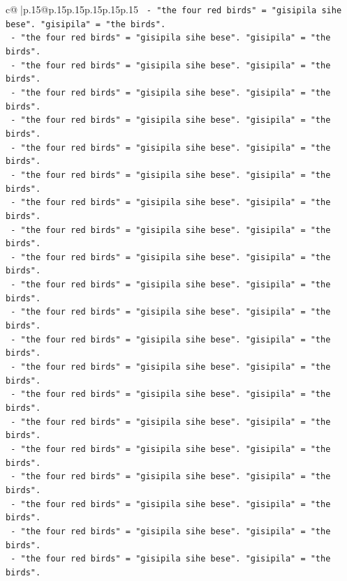 \documentclass{article}
\begin{document}
{\begin{supertabular}{c@{$\;$}|p{.15\linewidth}@{}p{.15\linewidth}p{.15\linewidth}p{.15\linewidth}p{.15\linewidth}p{.15\linewidth}}
{{{\texttt{  {-} "the four red birds" = "gisipila sihe bese". "gisipila" = "the birds".} \\
\texttt{  {-} "the four red birds" = "gisipila sihe bese". "gisipila" = "the birds".} \\
\texttt{  {-} "the four red birds" = "gisipila sihe bese". "gisipila" = "the birds".} \\
\texttt{  {-} "the four red birds" = "gisipila sihe bese". "gisipila" = "the birds".} \\
\texttt{  {-} "the four red birds" = "gisipila sihe bese". "gisipila" = "the birds".} \\
\texttt{  {-} "the four red birds" = "gisipila sihe bese". "gisipila" = "the birds".} \\
\texttt{  {-} "the four red birds" = "gisipila sihe bese". "gisipila" = "the birds".} \\
\texttt{  {-} "the four red birds" = "gisipila sihe bese". "gisipila" = "the birds".} \\
\texttt{  {-} "the four red birds" = "gisipila sihe bese". "gisipila" = "the birds".} \\
\texttt{  {-} "the four red birds" = "gisipila sihe bese". "gisipila" = "the birds".} \\
\texttt{  {-} "the four red birds" = "gisipila sihe bese". "gisipila" = "the birds".} \\
\texttt{  {-} "the four red birds" = "gisipila sihe bese". "gisipila" = "the birds".} \\
\texttt{  {-} "the four red birds" = "gisipila sihe bese". "gisipila" = "the birds".} \\
\texttt{  {-} "the four red birds" = "gisipila sihe bese". "gisipila" = "the birds".} \\
\texttt{  {-} "the four red birds" = "gisipila sihe bese". "gisipila" = "the birds".} \\
\texttt{  {-} "the four red birds" = "gisipila sihe bese". "gisipila" = "the birds".} \\
\texttt{  {-} "the four red birds" = "gisipila sihe bese". "gisipila" = "the birds".} \\
\texttt{  {-} "the four red birds" = "gisipila sihe bese". "gisipila" = "the birds".} \\
\texttt{  {-} "the four red birds" = "gisipila sihe bese". "gisipila" = "the birds".} \\
\texttt{  {-} "the four red birds" = "gisipila sihe bese". "gisipila" = "the birds".} \\
\texttt{  {-} "the four red birds" = "gisipila sihe bese". "gisipila" = "the birds".} \\
}}}
\end{supertabular}}
\end{document}
